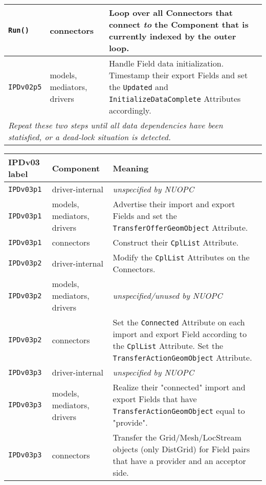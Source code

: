 \begin{longtable}[h]{|p{}|p{}|p{}|}
     {\tt Run()}    & connectors                  & Loop over all Connectors that connect {\it to} the Component that is currently indexed by the outer loop.\\ \hline
     {\tt IPDv02p5} & models, mediators, drivers  & Handle Field data initialization. Timestamp their export Fields and set the {\tt Updated} and {\tt InitializeDataComplete} Attributes accordingly.\\ \hline
     \multicolumn{3}{|p{13.5cm}|}{\it Repeat these two steps until all data
     dependencies have been statisfied, or a dead-lock situation is detected.}\\ 
     \hline\hline
\end{longtable}

\vspace*{3ex}
\begin{longtable}[h]{|p{}|p{}|p{}|}
     \hline\hline
     {\bf IPDv03 label} & {\bf Component} & {\bf Meaning}\\
     \hline\hline
     {\tt IPDv03p1} & driver-internal             & {\em unspecified by NUOPC}\\ \hline
     {\tt IPDv03p1} & models, mediators, drivers  & Advertise their import and export Fields and set the {\tt TransferOfferGeomObject} Attribute.\\ \hline
     {\tt IPDv03p1} & connectors                  & Construct their {\tt CplList} Attribute.\\ \hline
     {\tt IPDv03p2} & driver-internal             & Modify the {\tt CplList} Attributes on the Connectors.\\ \hline
     {\tt IPDv03p2} & models, mediators, drivers  & {\em unspecified/unused by NUOPC}\\ \hline
     {\tt IPDv03p2} & connectors                  & Set the {\tt Connected} Attribute on each import and export Field according to the {\tt CplList} Attribute. Set the {\tt TransferActionGeomObject} Attribute.\\ \hline
     {\tt IPDv03p3} & driver-internal             & {\em unspecified by NUOPC}\\ \hline
     {\tt IPDv03p3} & models, mediators, drivers  & Realize their "connected" import and export Fields that have {\tt TransferActionGeomObject} equal to "provide".\\ \hline
     {\tt IPDv03p3} & connectors                  & Transfer the Grid/Mesh/LocStream objects (only DistGrid) for Field pairs that have a provider and an acceptor side.\\ \hline

\end{longtable}

